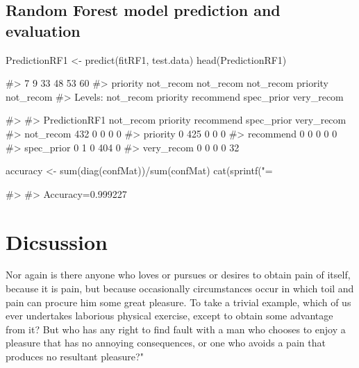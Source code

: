 \hypertarget{random-forest-model-prediction-and-evaluation}{%
\subsection{Random Forest model prediction and
evaluation}\label{random-forest-model-prediction-and-evaluation}}

\begin{Schunk}
\begin{Sinput}
PredictionRF1 <- predict(fitRF1, test.data)
head(PredictionRF1)
\end{Sinput}
\begin{Soutput}
#>         7         9        33        48        53        60 
#>  priority not_recom not_recom not_recom  priority not_recom 
#> Levels: not_recom priority recommend spec_prior very_recom
\end{Soutput}
\end{Schunk}

\begin{Schunk}
\begin{Soutput}
#>              
#> PredictionRF1 not_recom priority recommend spec_prior very_recom
#>    not_recom        432        0         0          0          0
#>    priority           0      425         0          0          0
#>    recommend          0        0         0          0          0
#>    spec_prior         0        1         0        404          0
#>    very_recom         0        0         0          0         32
\end{Soutput}
\begin{Sinput}
accuracy <- sum(diag(confMat))/sum(confMat)
cat(sprintf("\nAccuracy=%
\end{Sinput}
\begin{Soutput}
#> 
#> Accuracy=0.999227
\end{Soutput}
\end{Schunk}

\hypertarget{dicsussion}{%
\section{Dicsussion}\label{dicsussion}}

Nor again is there anyone who loves or pursues or desires to obtain pain
of itself, because it is pain, but because occasionally circumstances
occur in which toil and pain can procure him some great pleasure. To
take a trivial example, which of us ever undertakes laborious physical
exercise, except to obtain some advantage from it? But who has any right
to find fault with a man who chooses to enjoy a pleasure that has no
annoying consequences, or one who avoids a pain that produces no
resultant pleasure?"

